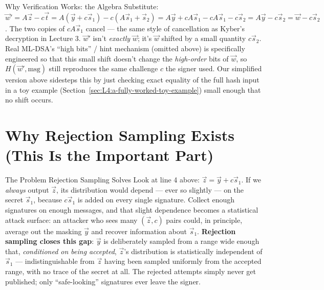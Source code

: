 \begin{rmkbox}{Why Verification Works: the Algebra}
Substitute: $\vec w' = A\vec z - c\vec t = A(\vec y + c\vec s_1) - c(A\vec s_1+\vec s_2) = A\vec y + cA\vec s_1 - cA\vec s_1 - c\vec s_2 = A\vec y - c\vec s_2 = \vec w - c\vec s_2$. The two copies of $cA\vec s_1$ cancel --- the same style of cancellation as Kyber's decryption in Lecture 3. $\vec w'$ isn't \emph{exactly} $\vec w$; it's $\vec w$ shifted by a small quantity $c\vec s_2$. Real ML-DSA's ``high bits'' / hint mechanism (omitted above) is specifically engineered so that this small shift doesn't change the \emph{high-order} bits of $\vec w$, so $H(\vec w', \text{msg})$ still reproduces the same challenge $c$ the signer used. Our simplified version above sidesteps this by just checking exact equality of the full hash input in a toy example (Section~\ref{sec:L4:a-fully-worked-toy-example}) small enough that no shift occurs.
\end{rmkbox}

\section{Why Rejection Sampling Exists (This Is the Important Part)}
\label{sec:L4:why-rejection-sampling-exists-this-is-th}

\begin{rmkbox}{The Problem Rejection Sampling Solves}
Look at line 4 above: $\vec z = \vec y + c\vec s_1$. If we \emph{always} output $\vec z$, its distribution would depend --- ever so slightly --- on the secret $\vec s_1$, because $c\vec s_1$ is added on every single signature. Collect enough signatures on enough messages, and that slight dependence becomes a statistical attack surface: an attacker who sees many $(\vec z, c)$ pairs could, in principle, average out the masking $\vec y$ and recover information about $\vec s_1$. \textbf{Rejection sampling closes this gap}: $\vec y$ is deliberately sampled from a range wide enough that, \emph{conditioned on being accepted}, $\vec z$'s distribution is statistically independent of $\vec s_1$ --- indistinguishable from $\vec z$ having been sampled uniformly from the accepted range, with no trace of the secret at all. The rejected attempts simply never get published; only ``safe-looking'' signatures ever leave the signer.
\end{rmkbox}

